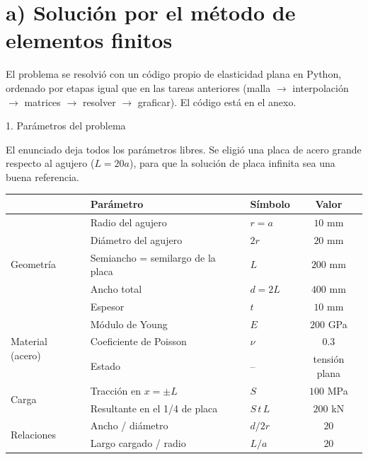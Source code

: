 \newpage
\section*{a) Soluci\'on por el m\'etodo de elementos finitos}

El problema se resolvi\'o con un c\'odigo propio de elasticidad plana en Python,
ordenado por etapas igual que en las tareas anteriores (malla $\to$
interpolaci\'on $\to$ matrices $\to$ resolver $\to$ graficar). El c\'odigo est\'a
en el anexo.

\begin{desarrollo}{1. Par\'ametros del problema}

El enunciado deja todos los par\'ametros libres. Se eligi\'o una placa de acero
grande respecto al agujero ($L=20a$), para que la soluci\'on de placa infinita
sea una buena referencia.

\begin{center}
\renewcommand{\arraystretch}{1.2}
\begin{tabular}{@{}lllc@{}}
\toprule
& Par\'ametro & S\'imbolo & Valor \\
\midrule
\multirow{5}{*}{Geometr\'ia}
& Radio del agujero & $r=a$ & $10$ mm \\
& Di\'ametro del agujero & $2r$ & $20$ mm \\
& Semiancho = semilargo de la placa & $L$ & $200$ mm \\
& Ancho total & $d=2L$ & $400$ mm \\
& Espesor & $t$ & $10$ mm \\
\midrule
\multirow{3}{*}{Material (acero)}
& M\'odulo de Young & $E$ & $200$ GPa \\
& Coeficiente de Poisson & $\nu$ & $0.3$ \\
& Estado & -- & tensi\'on plana \\
\midrule
\multirow{2}{*}{Carga}
& Tracci\'on en $x=\pm L$ & $S$ & $100$ MPa \\
& Resultante en el 1/4 de placa & $S\,t\,L$ & $200$ kN \\
\midrule
\multirow{2}{*}{Relaciones}
& Ancho / di\'ametro & $d/2r$ & $20$ \\
& Largo cargado / radio & $L/a$ & $20$ \\
\bottomrule
\end{tabular}
\end{center}


\end{desarrollo}
